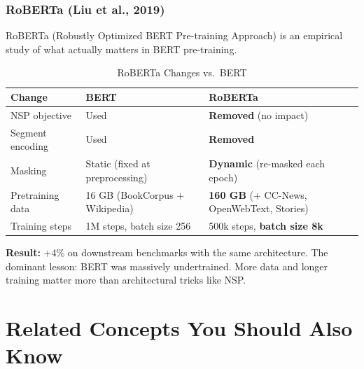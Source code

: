 \documentclass[11pt, a4paper]{article}
\begin{document}
\subsubsection{RoBERTa (Liu et al., 2019)}

RoBERTa (Robustly Optimized BERT Pre-training Approach) is an empirical study of what actually matters in BERT pre-training.

\begin{table}[h]
\centering
\caption{RoBERTa Changes vs.\ BERT}
\begin{tabular}{@{}lll@{}}
\toprule
\textbf{Change} & \textbf{BERT} & \textbf{RoBERTa} \\
\midrule
NSP objective & Used & \textbf{Removed} (no impact) \\
Segment encoding & Used & \textbf{Removed} \\
Masking & Static (fixed at preprocessing) & \textbf{Dynamic} (re-masked each epoch) \\
Pretraining data & 16 GB (BookCorpus + Wikipedia) & \textbf{160 GB} (+ CC-News, OpenWebText, Stories) \\
Training steps & 1M steps, batch size 256 & 500k steps, \textbf{batch size 8k} \\
\bottomrule
\end{tabular}
\end{table}

\textbf{Result:} +4\% on downstream benchmarks with the same architecture. The dominant lesson: BERT was massively undertrained. More data and longer training matter more than architectural tricks like NSP.

\newpage
\section{Related Concepts You Should Also Know}
\end{document}
